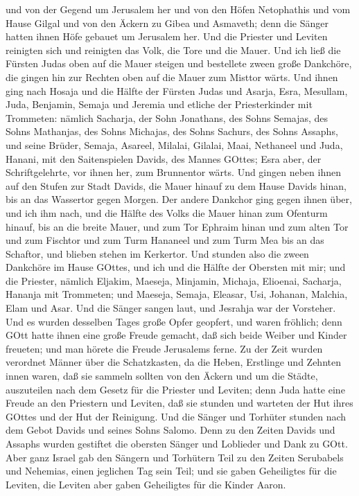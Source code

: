 und von der Gegend um Jerusalem her und von den Höfen Netophathis
 und vom Hause Gilgal und von den Äckern zu Gibea und
Asmaveth; denn die Sänger hatten ihnen Höfe gebauet um Jerusalem her.
 Und die Priester und Leviten reinigten sich und reinigten
das Volk, die Tore und die Mauer.  Und ich ließ die Fürsten
Judas oben auf die Mauer steigen und bestellete zween große Dankchöre,
die gingen hin zur Rechten oben auf die Mauer zum Misttor wärts.
 Und ihnen ging nach Hosaja und die Hälfte der Fürsten
Judas  und Asarja, Esra, Mesullam,  Juda,
Benjamin, Semaja und Jeremia  und etliche der
Priesterkinder mit Trommeten: nämlich Sacharja, der Sohn Jonathans, des
Sohns Semajas, des Sohns Mathanjas, des Sohns Michajas, des Sohns
Sachurs, des Sohns Assaphs,  und seine Brüder, Semaja,
Asareel, Milalai, Gilalai, Maai, Nethaneel und Juda, Hanani, mit den
Saitenspielen Davids, des Mannes GOttes; Esra aber, der Schriftgelehrte,
vor ihnen her,  zum Brunnentor wärts. Und gingen neben
ihnen auf den Stufen zur Stadt Davids, die Mauer hinauf zu dem Hause
Davids hinan, bis an das Wassertor gegen Morgen.  Der
andere Dankchor ging gegen ihnen über, und ich ihm nach, und die Hälfte
des Volks die Mauer hinan zum Ofenturm hinauf, bis an die breite Mauer,
 und zum Tor Ephraim hinan und zum alten Tor und zum
Fischtor und zum Turm Hananeel und zum Turm Mea bis an das Schaftor, und
blieben stehen im Kerkertor.  Und stunden also die zween
Dankchöre im Hause GOttes, und ich und die Hälfte der Obersten mit mir;
 und die Priester, nämlich Eljakim, Maeseja, Minjamin,
Michaja, Elioenai, Sacharja, Hananja mit Trommeten;  und
Maeseja, Semaja, Eleasar, Usi, Johanan, Malchia, Elam und Asar. Und die
Sänger sangen laut, und Jesrahja war der Vorsteher.  Und es
wurden desselben Tages große Opfer geopfert, und waren fröhlich; denn
GOtt hatte ihnen eine große Freude gemacht, daß sich beide Weiber und
Kinder freueten; und man hörete die Freude Jerusalems ferne.
 Zu der Zeit wurden verordnet Männer über die Schatzkasten,
da die Heben, Erstlinge und Zehnten innen waren, daß sie sammeln sollten
von den Äckern und um die Städte, auszuteilen nach dem Gesetz für die
Priester und Leviten; denn Juda hatte eine Freude an den Priestern und
Leviten, daß sie stunden  und warteten der Hut ihres GOttes
und der Hut der Reinigung. Und die Sänger und Torhüter stunden nach dem
Gebot Davids und seines Sohns Salomo.  Denn zu den Zeiten
Davids und Assaphs wurden gestiftet die obersten Sänger und Loblieder
und Dank zu GOtt.  Aber ganz Israel gab den Sängern und
Torhütern Teil zu den Zeiten Serubabels und Nehemias, einen jeglichen
Tag sein Teil; und sie gaben Geheiligtes für die Leviten, die Leviten
aber gaben Geheiligtes für die Kinder Aaron.

